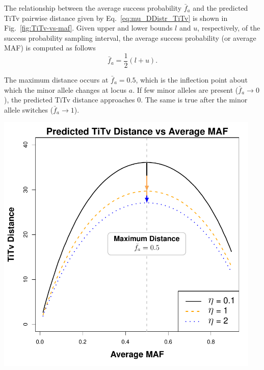 \documentclass[10pt,letterpaper]{article}\usepackage[]{graphicx}\usepackage[]{color}
\begin{document}
The relationship between the average success probability $\bar{f}_a$ and the predicted TiTv pairwise distance given by Eq.~\ref{eq:mu_DDistr_TiTv} is shown in Fig.~\ref{fig:TiTv-vs-maf}. Given upper and lower bounds $l$ and $u$, respectively, of the success probability sampling interval, the average success probability (or average MAF) is computed as follows
%
\begin{equation}\label{eq:avg_maf}
\bar{f}_a = \frac{1}{2}(l + u).
\end{equation}

The maximum distance occurs at $\bar{f}_a=0.5$, which is the inflection point about which the minor allele changes at locus $a$. If few minor alleles are present ($\bar{f}_a \to 0$), the predicted TiTv distance approaches 0. The same is true after the minor allele switches ($\bar{f}_a \to 1$).

\bigskip

\begin{minipage}[c]{0.7\textwidth}\hspace{-0.6cm}
	\includegraphics[width=0.95\textwidth]{TiTv_distance-vs-maf.pdf}
\end{minipage}\hspace{-0.8cm}
\begin{minipage}[c]{0.3\textwidth}
	\label{fig:TiTv-vs-maf}
\end{minipage}
\end{document}
